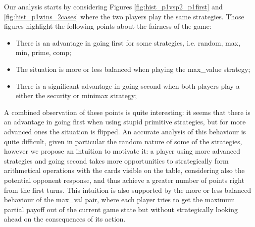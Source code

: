 
 Our analysis starts by considering Figures \ref{fig:hist_p1vsp2_p1first} and \ref{fig:hist_p1wins_2cases} where the two players play the same strategies.
 Those figures highlight the following points about the fairness of the game:
 \begin{itemize}
 	\item There is an advantage in going first for some strategies, i.e. random, max, min, prime, comp;
 	\item The situation is more or less balanced when playing the max\_value strategy;
 	\item There is a significant advantage in going second when both players play a either the security or minimax strategy;
 \end{itemize}
 A combined observation of these points is quite interesting: it seems that there is an advantage in going first when using stupid primitive strategies, but for more advanced ones the situation is flipped. An accurate analysis of this behaviour is quite difficult, given in particular the random nature of some of the strategies, however we propose an intuition to motivate it: a player using more advanced strategies and going second takes more opportunities to strategically form arithmetical operations with the cards visible on the table, considering also the potential opponent response, and thus achieve a greater number of points right from the first turns. This intuition is also supported by the more or less balanced behaviour of the max\_val pair, where each player tries to get the maximum partial payoff out of the current game state but without strategically looking ahead on the consequences of its action.

